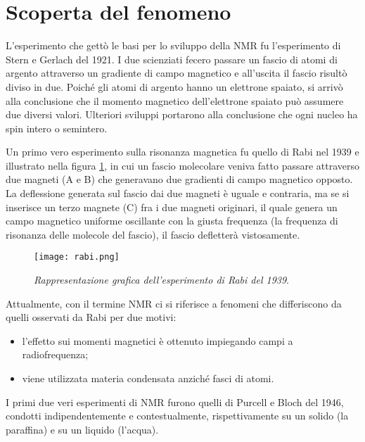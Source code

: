 \documentclass{report}
\newcommand{\figref}[1]{figura \ref{#1}}
\numberwithin{equation}{section}
\numberwithin{figure}{section}
\begin{document}
\section{Scoperta del fenomeno}
L'esperimento che gettò le basi per lo sviluppo della NMR fu l'esperimento di Stern e Gerlach del 1921. I due scienziati fecero passare un fascio di atomi di argento attraverso un gradiente di campo magnetico e all'uscita il fascio risultò diviso in due. Poiché gli atomi di argento hanno un elettrone spaiato, si arrivò alla conclusione che il momento magnetico dell'elettrone spaiato può assumere due diversi valori. Ulteriori sviluppi portarono alla conclusione che ogni nucleo ha spin intero o semintero.

Un primo vero esperimento sulla risonanza magnetica fu quello di Rabi nel 1939 e illustrato nella \figref{fig:rabi}, in cui un fascio molecolare veniva fatto passare attraverso due magneti (A e B) che generavano due gradienti di campo magnetico opposto. La deflessione generata sul fascio dai due magneti è uguale e contraria, ma se si inserisce un terzo magnete (C) fra i due magneti originari, il quale genera un campo magnetico uniforme oscillante con la giusta frequenza (la frequenza di risonanza delle molecole del fascio), il fascio defletterà vistosamente. 

\begin{figure}[htp]
    \centering
    \texttt{[image: rabi.png]}
    \caption{\textit{Rappresentazione grafica dell'esperimento di Rabi del 1939}.}
    \label{fig:rabi}
\end{figure}

Attualmente, con il termine NMR ci si riferisce a fenomeni che differiscono da quelli osservati da Rabi per due motivi:
\begin{itemize}[label=$-$]
    \item l'effetto sui momenti magnetici è ottenuto impiegando campi a radiofrequenza;
    \item viene utilizzata materia condensata anziché fasci di atomi.
\end{itemize}
I primi due veri esperimenti di NMR furono quelli di Purcell e Bloch del 1946, condotti indipendentemente e contestualmente, rispettivamente su un solido (la paraffina) e su un liquido (l'acqua).
\end{document}
